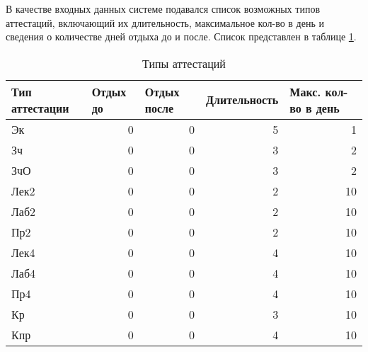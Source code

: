 В качестве входных данных системе подавался список возможных типов аттестаций, включающий их длительность, максимальное кол-во в день и сведения о количестве дней отдыха до и после. Список представлен в таблице \ref{table:att}.
\begin{table}[htbp]
	\centering\small 
	\caption{Типы аттестаций}%
	\begin{tabular}{|l|r|r|r|r|}
		\hline
		Тип аттестации & \multicolumn{1}{l|}{Отдых до} & \multicolumn{1}{l|}{Отдых после} & \multicolumn{1}{l|}{Длительность} & \multicolumn{1}{l|}{Макс. кол-во в день} \\ \hline
		Эк             & 0                             & 0                                & 5                                 & 1                                        \\ \hline
		Зч             & 0                             & 0                                & 3                                 & 2                                        \\ \hline
		ЗчО            & 0                             & 0                                & 3                                 & 2                                        \\ \hline
		Лек2           & 0                             & 0                                & 2                                 & 10                                       \\ \hline
		Лаб2           & 0                             & 0                                & 2                                 & 10                                       \\ \hline
		Пр2            & 0                             & 0                                & 2                                 & 10                                       \\ \hline
		Лек4           & 0                             & 0                                & 4                                 & 10                                       \\ \hline
		Лаб4           & 0                             & 0                                & 4                                 & 10                                       \\ \hline
		Пр4            & 0                             & 0                                & 4                                 & 10                                       \\ \hline
		Кр             & 0                             & 0                                & 3                                 & 10                                       \\ \hline
		Кпр            & 0                             & 0                                & 4                                 & 10                                       \\ \hline
	\end{tabular} \label{table:att}
\end{table} 
\FloatBarrier


